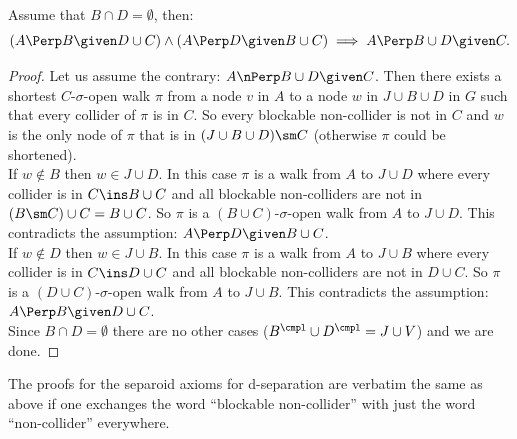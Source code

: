 \begin{Lem} Assume that $B \cap D = \emptyset$, then:
    \[ (A \Perp  B \given D \cup  C) \land (A \Perp  D \given B \cup C) \implies A  \Perp  B \cup D \given   C.\]
\begin{proof}
    Let us assume the contrary:  $A \nPerp  B \cup D \given C$.
    Then there exists a shortest $C$-$\sigma$-open walk $\pi$ 
    from a node $v$ in $A$ to a node $w$ in $J \cup B \cup D $ in $G$ such that every collider of $\pi$ is in $C$.
    So every blockable non-collider is not in $C$ and $w$ is 
    the only node of $\pi$ that is in $(J \cup B \cup D) \sm C$ (otherwise $\pi$ could be shortened). \\
    If $w \notin B$ then $w \in J \cup D$. In this case $\pi$ is a walk from $A$ to $J \cup D$ where every collider is in
    $C \ins B \cup C$ and all blockable non-colliders are not in $(B\sm C) \cup C = B \cup C$. 
    So $\pi$ is a $(B \cup C)$-$\sigma$-open walk from $A$ to $J \cup D$.
    This contradicts the assumption: $A \Perp  D \given B \cup C$.\\
    If $w \notin D$ then $w \in J \cup B$. In this case $\pi$ is a walk from $A$ to $J \cup B$ where every collider is in
    $C \ins D \cup C$ and all blockable non-colliders are not in $D \cup C$. 
    So $\pi$ is a $(D \cup C)$-$\sigma$-open walk from $A$ to $J \cup B$.
    This contradicts the assumption: $A \Perp  B \given D \cup  C$.\\
    Since $B \cap D = \emptyset$ there are no other cases ($B^\cmpl \cup D^\cmpl = J \cup V$) and we are done.
\end{proof}
\end{Lem}


\begin{Rem}
    The proofs for the separoid axioms for d-separation are verbatim the same as above if one exchanges the word ``blockable non-collider'' with just the word ``non-collider'' everywhere.
\end{Rem}
